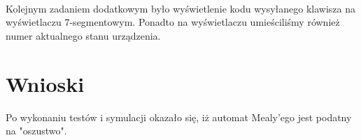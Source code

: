 \documentclass[wide,a4paper,titlepage,12pt] {article}
\begin{document}
\paragraph{}

Kolejnym zadaniem dodatkowym było wyświetlenie kodu wysyłanego klawisza na wyświetlaczu 7-segmentowym. Ponadto na wyświetlaczu umieściliśmy również numer aktualnego stanu urządzenia.

  \newpage
  \section{Wnioski}
  Po wykonaniu testów i symulacji okazało się, iż automat Mealy'ego jest podatny na "oszustwo".
\end{document}
